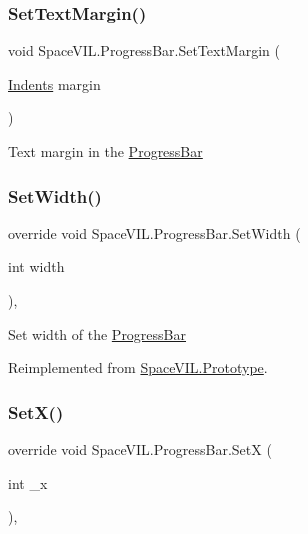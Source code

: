 \subsubsection{\texorpdfstring{Set\+Text\+Margin()}{SetTextMargin()}}
{\footnotesize\ttfamily void Space\+V\+I\+L.\+Progress\+Bar.\+Set\+Text\+Margin (\begin{DoxyParamCaption}\item[{\mbox{\hyperlink{struct_space_v_i_l_1_1_decorations_1_1_indents}{Indents}}}]{margin }\end{DoxyParamCaption})\hspace{0.3cm}{\ttfamily [inline]}}



Text margin in the \mbox{\hyperlink{class_space_v_i_l_1_1_progress_bar}{Progress\+Bar}} 

\mbox{\label{class_space_v_i_l_1_1_progress_bar_af970d2e5eed12540914beb9978e25665}} 
\subsubsection{\texorpdfstring{Set\+Width()}{SetWidth()}}
{\footnotesize\ttfamily override void Space\+V\+I\+L.\+Progress\+Bar.\+Set\+Width (\begin{DoxyParamCaption}\item[{int}]{width }\end{DoxyParamCaption})\hspace{0.3cm}{\ttfamily [inline]}, {\ttfamily [virtual]}}



Set width of the \mbox{\hyperlink{class_space_v_i_l_1_1_progress_bar}{Progress\+Bar}} 



Reimplemented from \mbox{\hyperlink{class_space_v_i_l_1_1_prototype_a6a4f1b9581f4d18f1c3a3e287d4b2a2b}{Space\+V\+I\+L.\+Prototype}}.

\mbox{\label{class_space_v_i_l_1_1_progress_bar_a5ceeeefd0b4fb56ba6226d294e784a3e}} 
\subsubsection{\texorpdfstring{Set\+X()}{SetX()}}
{\footnotesize\ttfamily override void Space\+V\+I\+L.\+Progress\+Bar.\+SetX (\begin{DoxyParamCaption}\item[{int}]{\+\_\+x }\end{DoxyParamCaption})\hspace{0.3cm}{\ttfamily [inline]}, {\ttfamily [virtual]}}




